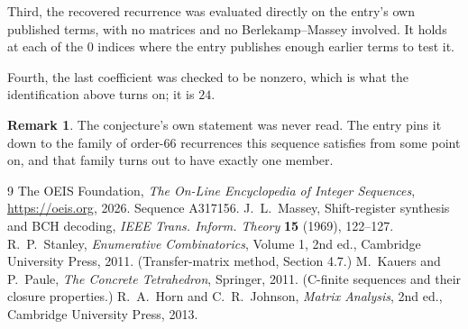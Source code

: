 \documentclass[11pt,a4paper]{article}
\theoremstyle{plain}
\theoremstyle{definition}
\newtheorem{remark}[theorem]{Remark}
\begin{document}
Third, the recovered recurrence was evaluated directly on the entry's own published terms, with
no matrices and no Berlekamp--Massey involved. It holds at each of the $0$ indices where
the entry publishes enough earlier terms to test it.

Fourth, the last coefficient was checked to be nonzero, which is what the identification above
turns on; it is $24$.

\begin{remark}
The conjecture's own statement was never read. The entry pins it down to the family of
order-$66$ recurrences this sequence satisfies from some point on, and that family turns
out to have exactly one member.
\end{remark}

\begin{thebibliography}{9}
 The OEIS Foundation, \emph{The On-Line Encyclopedia of Integer
Sequences}, \url{https://oeis.org}, 2026. Sequence A317156.
 J.~L.~Massey, Shift-register synthesis and BCH decoding, \emph{IEEE
Trans. Inform. Theory} \textbf{15} (1969), 122--127.
 R.~P.~Stanley, \emph{Enumerative Combinatorics}, Volume 1, 2nd ed.,
Cambridge University Press, 2011. (Transfer-matrix method, Section 4.7.)
 M.~Kauers and P.~Paule, \emph{The Concrete Tetrahedron}, Springer, 2011.
(C-finite sequences and their closure properties.)
 R.~A.~Horn and C.~R.~Johnson, \emph{Matrix Analysis}, 2nd ed., Cambridge
University Press, 2013.
\end{thebibliography}
\end{document}
